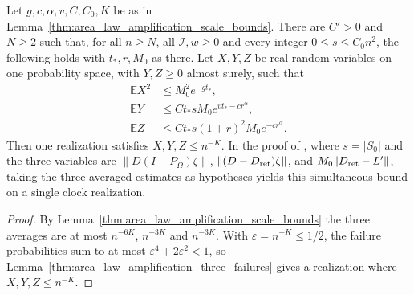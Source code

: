 \begin{lemma}
    \label{thm:area_law_amplification_good_realization}
    \leanok
    Let $g,c,\alpha,v,C,C_0,K$ be as in
    Lemma~\ref{thm:area_law_amplification_scale_bounds}. There are $C'>0$
    and $N\ge2$ such that, for all $n\ge N$, all $\mathcal I,w\ge0$ and every
    integer $0\le s\le C_0n^2$, the following holds with $t_*,r,M_0$ as
    there. Let $X,Y,Z$ be real random variables on one probability space,
    with $Y,Z\ge0$ almost surely, such that
    \begin{align*}
        \mathbb EX^2 & \le M_0^2e^{-gt_*},                \\
        \mathbb EY   & \le Ct_*sM_0e^{vt_*-cr^\alpha},    \\
        \mathbb EZ   & \le Ct_*s(1+r)^2M_0e^{-cr^\alpha}.
    \end{align*}
    Then one realization satisfies $X,Y,Z\le n^{-K}$.
    In the proof of \cite[Proposition~10.2]{OpenAI2026AreaLaw}, where $s=|S_0|$
    and the three variables are $\|D(I-P_\Omega)\zeta\|$,
    $\|(D-D_{\rm ret})\zeta\|$, and $M_0\|D_{\rm ret}-L'\|$,
    taking the three averaged estimates as hypotheses yields this simultaneous
    bound on a single clock realization.
\end{lemma}
\begin{proof}
    \leanok
    By Lemma~\ref{thm:area_law_amplification_scale_bounds} the three
    averages are at most $n^{-6K}$, $n^{-3K}$ and $n^{-3K}$. With
    $\varepsilon=n^{-K}\le1/2$, the failure probabilities sum to at most
    $\varepsilon^4+2\varepsilon^2<1$, so
    Lemma~\ref{thm:area_law_amplification_three_failures} gives a realization
    where $X,Y,Z\le n^{-K}$.
\end{proof}
